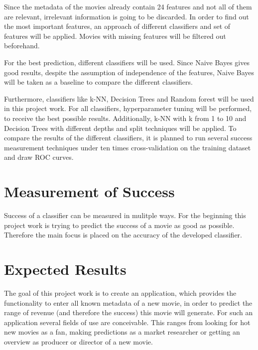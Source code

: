 Since the metadata of the movies already contain 24 features and not all of them are relevant, irrelevant information is going to be discarded. In order to find out the most important features, an approach of different classifiers and set of features will be applied. Movies with missing features will be filtered out beforehand. 

For the best prediction, different classifiers will be used. Since Naive Bayes gives good results, despite the assumption of independence of the features, Naive Bayes will be taken as a baseline to compare the different classifiers.

Furthermore, classifiers like k-NN, Decision Trees and Random forest will be used in this project work. For all classifiers, hyperparameter tuning will be performed, to receive the best possible results. Additionally, k-NN with k from 1 to 10 and Decision Trees with different depths and split techniques will be applied.
To compare the results of the different classifiers, it is planned to run several success measurement techniques under ten times cross-validation on the training dataset and draw ROC curves.


\section{Measurement of Success}
Success of a classifier can be measured in mulitple ways. For the beginning this project work is trying to predict the success of a movie as good as possible. Therefore the main focus is placed on the accuracy of the developed classifier.

\section{Expected Results}
The goal of this project work is to create an application, which provides the functionality to enter all known metadata of a new movie, in order to predict the range of revenue (and therefore the success) this movie will generate. For such an application several fields of use are conceivable. This ranges from looking for hot new movies as a fan, making predictions as a market researcher or getting an overview as producer or director of a new movie.





